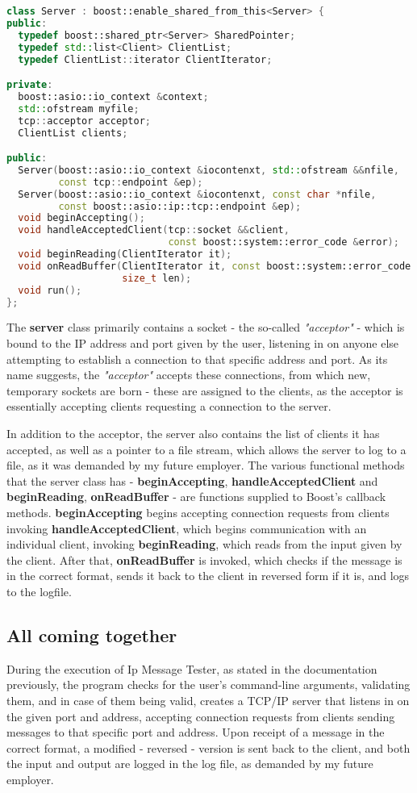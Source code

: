 \documentclass[openany,10pt,a4paper]{book}
\begin{document}
\begin{lstlisting}[language=C++]
class Server : boost::enable_shared_from_this<Server> {
public:
  typedef boost::shared_ptr<Server> SharedPointer;
  typedef std::list<Client> ClientList;
  typedef ClientList::iterator ClientIterator;

private:
  boost::asio::io_context &context;
  std::ofstream myfile;
  tcp::acceptor acceptor;
  ClientList clients;

public:
  Server(boost::asio::io_context &iocontenxt, std::ofstream &&nfile,
         const tcp::endpoint &ep);
  Server(boost::asio::io_context &iocontenxt, const char *nfile,
         const boost::asio::ip::tcp::endpoint &ep);
  void beginAccepting();
  void handleAcceptedClient(tcp::socket &&client,
                            const boost::system::error_code &error);
  void beginReading(ClientIterator it);
  void onReadBuffer(ClientIterator it, const boost::system::error_code &ec,
                    size_t len);
  void run();
};
\end{lstlisting}

The \textbf{server} class primarily contains a socket - the so-called \textit{"acceptor"} - which is bound to the IP address and port given by the user, listening in on anyone else attempting to establish a connection to that specific address and port. As its name suggests, the \textit{"acceptor"} accepts these connections, from which new, temporary sockets are born - these are assigned to the clients, as the acceptor is essentially accepting clients requesting a connection to the server.

In addition to the acceptor, the server also contains the list of clients it has accepted, as well as a pointer to a file stream, which allows the server to log to a file, as it was demanded by my future employer. The various functional methods that the server class has - \textbf{beginAccepting}, \textbf{handleAcceptedClient} and \textbf{beginReading}, \textbf{onReadBuffer} - are functions supplied to Boost's callback methods. \textbf{beginAccepting} begins accepting connection requests from clients invoking \textbf{handleAcceptedClient}, which begins communication with an individual client, invoking \textbf{beginReading}, which reads from the input given by the client. After that, \textbf{onReadBuffer} is invoked, which checks if the message is in the correct format, sends it back to the client in reversed form if it is, and logs to the logfile.

\subsection{All coming together}

During the execution of Ip Message Tester, as stated in the documentation previously, the program checks for the user's command-line arguments, validating them, and in case of them being valid, creates a TCP/IP server that listens in on the given port and address, accepting connection requests from clients sending messages to that specific port and address. Upon receipt of a message in the correct format, a modified - reversed - version is sent back to the client, and both the input and output are logged in the log file, as demanded by my future employer.
\end{document}
